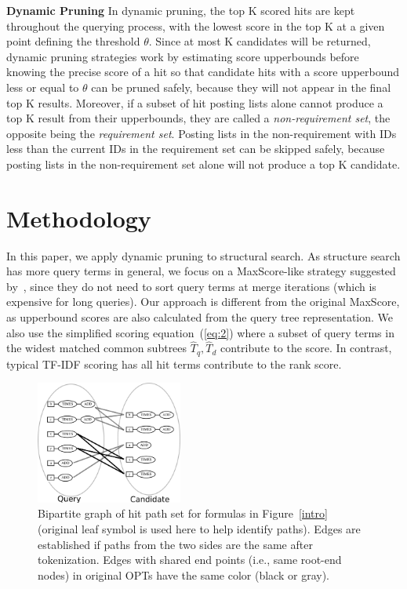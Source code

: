 \documentclass[runningheads]{llncs}
\begin{document}
\vspace{0.1in}
\noindent\textbf{Dynamic Pruning}\; In dynamic pruning, the top K scored hits are kept throughout the querying process, with the lowest score in the top K at a given point defining the threshold $\theta$. Since at most K candidates will be returned, dynamic pruning strategies work by estimating score upperbounds before knowing the precise score of a hit so that candidate hits with a score upperbound less or equal to $\theta$ can be pruned safely, because they will not appear in the final top K results.
Moreover, if a subset of hit posting lists alone cannot produce a top K result from their upperbounds, they are called a \textit{non-requirement set}, the opposite being the \textit{requirement set}.
%
Posting lists in the non-requirement with IDs less than the current IDs in the requirement set can be skipped safely, because posting lists in the non-requirement set alone will not produce a top K candidate.

\section{Methodology}
\label{strategy}
In this paper, we apply dynamic pruning to structural search.
As structure search has more query terms in general, we focus on a MaxScore-like strategy suggested by~\cite{Shandongdong2012, antonio2019}, since they do not need to sort query terms at merge iterations (which is expensive for long queries).
%
Our approach is different from the original MaxScore, as upperbound scores are also calculated from the query tree representation.
We also use the simplified scoring equation~(\ref{eq:2})
where a subset of query terms in the widest matched common subtrees $\hat{T}_q, \hat{T}_d$ contribute to the score.
In contrast, typical TF-IDF scoring has all hit terms contribute to the rank score.

\begin{figure}[!t]
\begin{center}
\includegraphics[width=1.90in]{fig/bipartile.eps}
\caption{Bipartite graph of hit path set for formulas in Figure~\ref{intro} (original leaf symbol is used here to help identify paths). Edges are established if paths from the two sides are the same after tokenization. Edges with shared end points (i.e., same root-end nodes) in original OPTs have the same color (black or gray). }
\label{bipart}
\end{center}
\end{figure}
\end{document}
